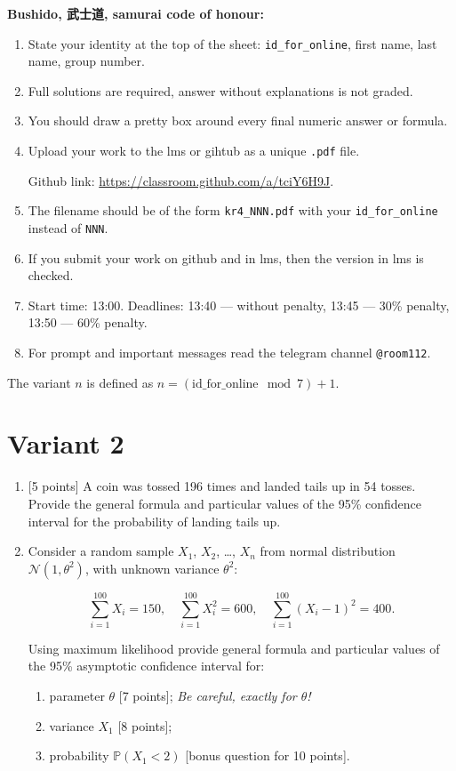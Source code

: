 \documentclass[12pt]{article}
\def \cN{\mathcal{N}}
\def \P{\mathbb{P}}
\newcommand \id {\mathrm{id}\_\mathrm{for}\_\mathrm{online}}
\begin{document}
\textbf{Bushido, 武士道, samurai code of honour:}

\vspace{5mm}

\begin{enumerate}
\item State your identity at the top of the sheet: \verb|id_for_online|, first name, last name, group number.
\item Full solutions are required, answer without explanations is not graded. 
\item You should draw a pretty box around every final numeric answer or formula.
\item Upload your work to the lms or gihtub as a unique \verb|.pdf| file.

Github link: \url{https://classroom.github.com/a/tciY6H9J}.
\item The filename should be of the form \verb|kr4_NNN.pdf| with your \verb|id_for_online| instead of \verb|NNN|.
\item If you submit your work on github and in lms, then the version in lms is checked.
\item Start time: 13:00. Deadlines: 13:40 — without penalty, 13:45 — 30\% penalty, 13:50 — 60\% penalty.
\item For prompt and important messages read the telegram channel \verb|@room112|.
\end{enumerate}


\newpage

The variant $n$ is defined as $n=(\id \mod 7)+1$. 


\section*{Variant 2}
\begin{enumerate}

\item {[5 points]} A coin was tossed 196 times and landed tails up in 54 tosses.
Provide the general formula and particular values
of the 95\% confidence interval for the probability of landing tails up.

\item Consider a random sample $X_1$, $X_2$, \ldots, $X_n$ from normal distribution $\cN(1, \theta^2)$, 
with unknown variance $\theta^2$:

\[
\sum_{i=1}^{100} X_i = 150, \quad \sum_{i=1}^{100} X_i^2 = 600, \quad \sum_{i=1}^{100} (X_i - 1)^2 = 400.  
\]

Using maximum likelihood 
provide general formula and particular values
of the 95\% asymptotic confidence interval for:

\begin{enumerate}
  \item parameter $\theta$ {[7 points]}; \textit{Be careful, exactly for $\theta$!}
  \item variance $X_1$ {[8 points]};
  \item probability $\P(X_1 < 2)$ {[bonus question for 10 points]}.
\end{enumerate}

\end{enumerate}
\end{document}
